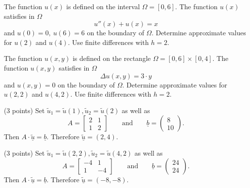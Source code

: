 \begin{teilaufgaben}
\item
The function $u(x)$ is defined on the interval $\Omega = [0,6].$ 
The function $u(x)$ satisfies in $\Omega$ 
\[
u''(x) + u(x) = x
\]
and  $u(0) = 0, \ u(6) = 6$ on the boundary of $\Omega$. 
Determine approximate values for $u(2)$ and $u(4)$. Use finite differences with $h = 2$. 
\item
The function $u(x,y)$ is defined on the rectangle
$\Omega = [0,6] \times [0,4]$. 
The function $u(x,y)$ satisfies in $\Omega$ 
\[
\Delta u(x,y) = 3 \cdot y
\]
and $u(x,y) = 0$ on the boundary of $\Omega$.
Determine approximate values for $u(2,2)$ and $u(4,2)$.
Use finite differences with $h = 2$. 
\end{teilaufgaben}

\begin{loesung}
\begin{teilaufgaben}
\item
(3 points) Set $\tilde u_1 = \tilde u(1), \tilde u_2 = \tilde u(2)$
as well as
\[
A
=
\left[\begin{array}{rr} 2 & 1  \\ 1 & 2  \end{array}\right]
\qquad \text{and}\qquad
\underline{b}
=
\left(\begin{array}{r} 8 \\ 10 \end{array}\right).
\]
Then $A \cdot \underline{\tilde u} = \underline{b}.$
Therefore $\underline{\tilde u} = (2,4)$.
\item
(3 points) Set $\tilde u_1 = \tilde u(2,2), \tilde u_2 = \tilde u(4,2)$
as well as
\[
A
=
\left[\begin{array}{rr} -4 & 1  \\ 1 & -4  \end{array}\right]
\qquad\text{and}\qquad
\underline{b}
=
\left(\begin{array}{r} 24 \\ 24 \end{array}\right).
\]
Then $A \cdot \underline{\tilde u} = \underline{b}$.
Therefore $\underline{\tilde u} = (-8,-8)$.
\qedhere
\end{teilaufgaben}
\end{loesung}

